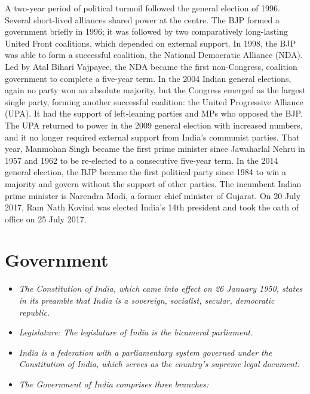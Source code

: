 A two-year period of political turmoil followed the general election of
1996. Several short-lived alliances shared power at the centre. The BJP
formed a government briefly in 1996; it was followed by two
comparatively long-lasting United Front coalitions, which depended on
external support. In 1998, the BJP was able to form a successful
coalition, the National Democratic Alliance (NDA). Led by Atal Bihari
Vajpayee, the NDA became the first non-Congress, coalition government to
complete a five-year term. In the 2004 Indian general elections, again
no party won an absolute majority, but the Congress emerged as the
largest single party, forming another successful coalition: the United
Progressive Alliance (UPA). It had the support of left-leaning parties
and MPs who opposed the BJP. The UPA returned to power in the 2009
general election with increased numbers, and it no longer required
external support from India's communist parties. That year, Manmohan
Singh became the first prime minister since Jawaharlal Nehru in 1957 and
1962 to be re-elected to a consecutive five-year term. In the 2014
general election, the BJP became the first political party since 1984 to
win a majority and govern without the support of other parties. The
incumbent Indian prime minister is Narendra Modi, a former chief
minister of Gujarat. On 20 July 2017, Ram Nath Kovind was elected
India's 14th president and took the oath of office on 25 July 2017.

\section{Government}\label{government}

\begin{itemize}
\item
  \emph{The Constitution of India, which came into effect on 26 January
  1950, states in its preamble that India is a sovereign, socialist,
  secular, democratic republic.}
\item
  \emph{Legislature: The legislature of India is the bicameral
  parliament.}
\item
  \emph{India is a federation with a parliamentary system governed under
  the Constitution of India, which serves as the country's supreme legal
  document.}
\item
  \emph{The Government of India comprises three branches:}
\end{itemize}

